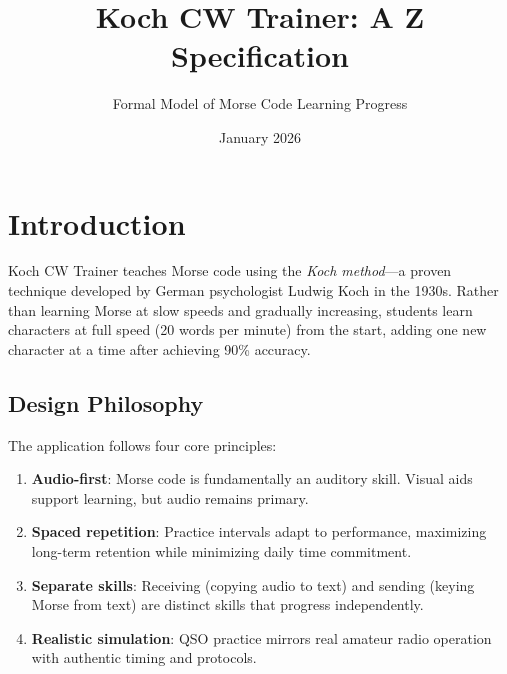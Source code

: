 \documentclass[a4paper,10pt,fleqn]{article}
\begin{document}
\title{Koch CW Trainer: A Z Specification}
\author{Formal Model of Morse Code Learning Progress}
\date{January 2026}
\maketitle

\tableofcontents
\newpage

\section{Introduction}

Koch CW Trainer teaches Morse code using the \emph{Koch method}---a proven technique
developed by German psychologist Ludwig Koch in the 1930s. Rather than learning
Morse at slow speeds and gradually increasing, students learn characters at full
speed (20 words per minute) from the start, adding one new character at a time
after achieving 90\% accuracy.

\subsection{Design Philosophy}

The application follows four core principles:

\begin{enumerate}
\item \textbf{Audio-first}: Morse code is fundamentally an auditory skill. Visual
      aids support learning, but audio remains primary.

\item \textbf{Spaced repetition}: Practice intervals adapt to performance,
      maximizing long-term retention while minimizing daily time commitment.

\item \textbf{Separate skills}: Receiving (copying audio to text) and sending
      (keying Morse from text) are distinct skills that progress independently.

\item \textbf{Realistic simulation}: QSO practice mirrors real amateur radio
      operation with authentic timing and protocols.
\end{enumerate}
\end{document}
